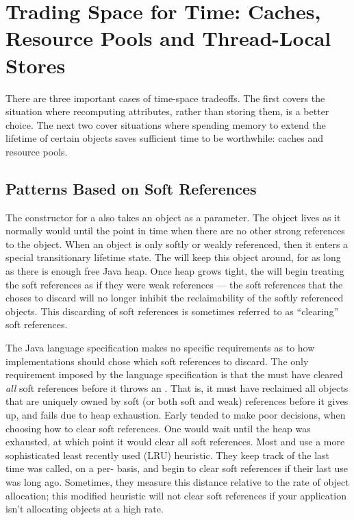 \chapter[Trading Space for Time]{Trading Space for Time: Caches, Resource Pools and Thread-Local
Stores}
\label{chapter:trading-space-for-time}

There are three important cases of time-space tradeoffs. The first covers
the situation where recomputing attributes, rather than storing them, is a better
choice. The next two cover situations where spending memory to extend the
lifetime of certain objects saves sufficient time to be worthwhile: caches and
resource pools.

\section{Patterns Based on Soft References}

The constructor for a  also takes an object as a parameter.
The object lives as it normally would until the point in time when there are no
other strong references to the object. When an object is only softly or weakly
referenced, then it enters a special transitionary lifetime state. The \jre will
keep this object around, for as long as there is enough free Java heap. Once heap
grows tight, the \jre will begin treating the soft references as if they were
weak references --- the soft references that the \jre choses to discard will no
longer inhibit the reclaimability of the softly referenced objects. This
discarding of soft references is sometimes referred to as ``clearing'' soft
references.

The Java language specification makes no specific requirements as to how \jre
implementations should chose which soft references to discard. The only
requirement imposed by the language specification is that the \jre must have
cleared \emph{all} soft references before it throws an
. That is, it must have reclaimed all objects that
are uniquely owned by soft (or both soft and weak) references before it gives up,
and fails due to heap exhaustion. Early \jres tended to make poor decisions, when
choosing how to clear soft references. One \jre would wait until the heap was
exhausted, at which point it would clear all soft references. Most \javafive and
\javasix \jres use a more sophisticated least recently used (LRU) heuristic.
They keep track of the last time  was called, on a per-
basis, and begin to clear soft references if their last use was long ago.
Sometimes, they measure this distance relative to the rate of object allocation;
this modified heuristic will not clear soft references if your application isn't
allocating objects at a high rate.

